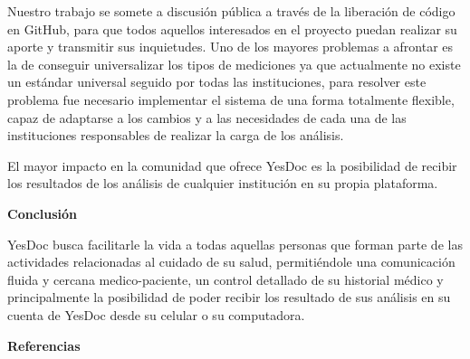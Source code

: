 \documentclass[a4paper,twocolumn,12pt]{article}
\newcommand{\chico}{\fontsize{10pt}{5em}\selectfont}
\begin{document}
Nuestro trabajo se somete a discusión pública a través de la liberación de código en GitHub, para que todos aquellos interesados en el proyecto puedan realizar su aporte y transmitir sus inquietudes.
Uno de los mayores problemas a afrontar es la de conseguir universalizar los tipos de mediciones ya que actualmente no existe un estándar universal seguido por todas las instituciones, para resolver este problema fue necesario implementar el sistema de una forma totalmente flexible, capaz de adaptarse a los cambios y a las necesidades de cada una de las instituciones responsables de realizar la carga de los análisis.

El mayor impacto en la comunidad que ofrece YesDoc es la posibilidad de recibir los resultados de los análisis de cualquier institución en su propia plataforma.


\vspace{3mm}
\textbf{Conclusión}

YesDoc busca facilitarle la vida a todas aquellas personas que forman parte de las actividades relacionadas al cuidado de su salud, permitiéndole una comunicación fluida y cercana medico-paciente, un control detallado de su historial médico y principalmente la posibilidad de poder recibir  los resultado de sus análisis en su cuenta de YesDoc desde su celular o su computadora.

\vspace{3mm}
{\chico \textbf{Referencias}}

{\chico

\nocite{*}
\printbibliography[
heading=bibintoc
]
}
\end{document}
